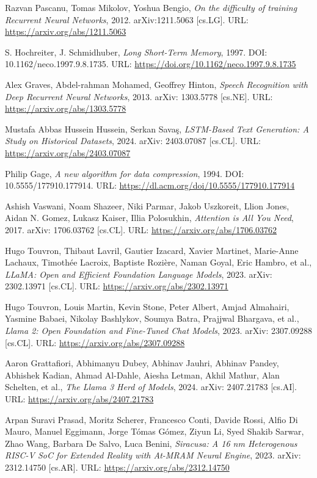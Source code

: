 \begin{thebibliography}{9}
	Razvan Pascanu, Tomas Mikolov, Yoshua Bengio,
	\textit{On the difficulty of training Recurrent Neural Networks},
	2012. arXiv:1211.5063 [cs.LG]. URL: \url{https://arxiv.org/abs/1211.5063}

	S. Hochreiter, J. Schmidhuber,
	\textit{Long Short-Term Memory}, 1997. DOI: 10.1162/neco.1997.9.8.1735.
	URL: \url{https://doi.org/10.1162/neco.1997.9.8.1735}

	Alex Graves, Abdel-rahman Mohamed, Geoffrey Hinton,
	\textit{Speech Recognition with Deep Recurrent Neural Networks},
	2013. arXiv: 1303.5778 [cs.NE]. URL: \url{https://arxiv.org/abs/1303.5778}

	Mustafa Abbas Hussein Hussein, Serkan Savaş,
	\textit{LSTM-Based Text Generation: A Study on Historical Datasets},
	2024. arXiv: 2403.07087 [cs.CL]. URL: \url{https://arxiv.org/abs/2403.07087}

	Philip Gage,
	\textit{A new algorithm for data compression}, 1994. DOI: 10.5555/177910.177914.
	URL: \url{https://dl.acm.org/doi/10.5555/177910.177914}

	Ashish Vaswani, Noam Shazeer, Niki Parmar, Jakob Uszkoreit, Llion Jones, Aidan N. Gomez, Lukasz Kaiser, Illia Polosukhin,
	\textit{Attention is All You Need},
	2017. arXiv: 1706.03762 [cs.CL]. URL: \url{https://arxiv.org/abs/1706.03762}

	Hugo Touvron, Thibaut Lavril, Gautier Izacard, Xavier Martinet, Marie-Anne Lachaux, Timothée Lacroix, Baptiste Rozière, Naman Goyal, Eric Hambro, et al.,
	\textit{LLaMA: Open and Efficient Foundation Language Models},
	2023. arXiv: 2302.13971 [cs.CL]. URL: \url{https://arxiv.org/abs/2302.13971}

	Hugo Touvron, Louis Martin, Kevin Stone, Peter Albert, Amjad Almahairi, Yasmine Babaei, Nikolay Bashlykov, Soumya Batra, Prajjwal Bhargava, et al.,
	\textit{Llama 2: Open Foundation and Fine-Tuned Chat Models},
	2023. arXiv: 2307.09288 [cs.CL]. URL: \url{https://arxiv.org/abs/2307.09288}

	Aaron Grattafiori, Abhimanyu Dubey, Abhinav Jauhri, Abhinav Pandey, Abhishek Kadian, Ahmad Al-Dahle, Aiesha Letman, Akhil Mathur, Alan Schelten, et al.,
	\textit{The Llama 3 Herd of Models},
	2024. arXiv: 2407.21783 [cs.AI]. URL: \url{https://arxiv.org/abs/2407.21783}

	Arpan Suravi Prasad, Moritz Scherer, Francesco Conti, Davide Rossi, Alfio Di Mauro, Manuel Eggimann, Jorge Tómas Gómez, Ziyun Li, Syed Shakib Sarwar, Zhao Wang, Barbara De Salvo, Luca Benini,
	\textit{Siracusa: A 16 nm Heterogenous RISC-V SoC for Extended Reality with At-MRAM Neural Engine},
	2023. arXiv: 2312.14750 [cs.AR]. URL: \url{https://arxiv.org/abs/2312.14750}
	

\end{thebibliography}

